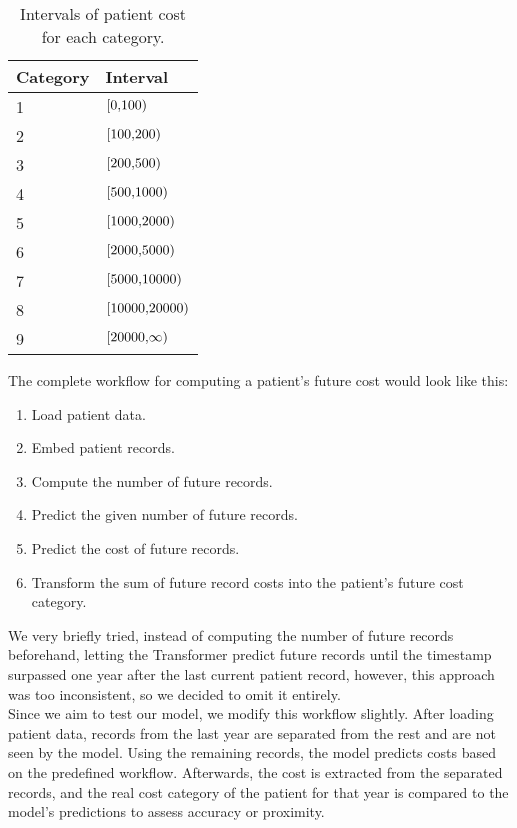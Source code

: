 \begin{table}[!h]
	\centering
	\begin{tabular}{|l|l|}
		\hline
		Category  & Interval \\ \hline
		1 & $\interval[{0,100})$ \\ \hline
		2 & $\interval[{100,200})$ \\ \hline
		3 & $\interval[{200,500})$ \\ \hline
		4 & $\interval[{500,1000})$ \\ \hline
		5 & $\interval[{1000,2000})$ \\ \hline
		6 & $\interval[{2000,5000})$ \\ \hline
		7 & $\interval[{5000,10000})$ \\ \hline
		8 & $\interval[{10000,20000})$ \\ \hline
		9 & $\interval[{20000,\infty})$ \\ \hline
	\end{tabular}
	\caption{Intervals of patient cost for each category.}
	\label{tab:patCost}
\end{table}  

The complete workflow for computing a patient’s future cost would look like this:

\begin{enumerate}
	\item Load patient data.
	\item Embed patient records.
	\item Compute the number of future records.
	\item Predict the given number of future records.
	\item Predict the cost of future records.
	\item Transform the sum of future record costs into the patient’s future cost category.
\end{enumerate}

We very briefly tried, instead of computing the number of future records beforehand, letting the Transformer predict future records until the timestamp surpassed one year after the last current patient record, however, this approach was too inconsistent, so we decided to omit it entirely.
\\

Since we aim to test our model, we modify this workflow slightly. After loading patient data, records from the last year are separated from the rest and are not seen by the model. Using the remaining records, the model predicts costs based on the predefined workflow. Afterwards, the cost is extracted from the separated records, and the real cost category of the patient for that year is compared to the model’s predictions to assess accuracy or proximity.
\\

